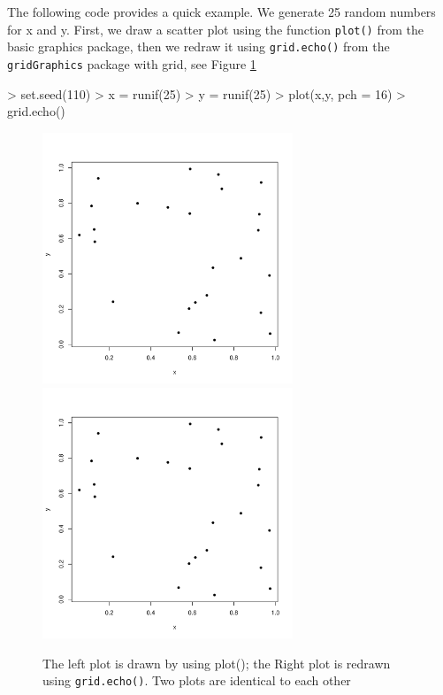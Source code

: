 \documentclass[paper=a4, fontsize=11pt]{report}
\begin{document}
The following code provides a quick example. We generate 25 random numbers for x and y. First, we draw a scatter plot using the function \texttt{plot()} from the basic graphics package, then we redraw it using \texttt{grid.echo()} from the \texttt{gridGraphics} package with grid, see Figure \ref{figure1}
\begin{Schunk}
\begin{Sinput}
> set.seed(110)
> x = runif(25)
> y = runif(25)
> plot(x,y, pch = 16)
> grid.echo()
\end{Sinput}
\end{Schunk}

\newpage
\begin{figure}[h]
\begin{center}
  \includegraphics[height = 7.5cm, width = 7.5cm]{figure/report_basic_demo_1.pdf}
  \includegraphics[height = 7.5cm, width = 7.5cm]{figure/report_basic_demo_1.pdf}
  \caption{The left plot is drawn by using plot(); the Right plot is redrawn using \texttt{grid.echo()}. Two plots are identical to each other}
  	\label{figure1}
\end{center}
\end{figure}
\end{document}
